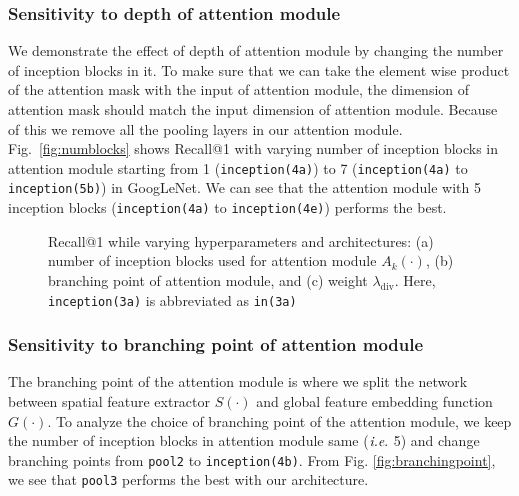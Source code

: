 \documentclass[runningheads]{llncs}
\begin{document}
\subsubsection{Sensitivity to depth of attention module}
We demonstrate the effect of depth of attention module by changing the number of inception blocks in it.
To make sure that we can take the element wise product of the attention mask with the input of attention module, the dimension of attention mask should match the input dimension of attention module.
Because of this we remove all the pooling layers in our attention module.
Fig.~\ref{fig:numblocks} shows Recall@1 with varying number of inception blocks in attention module starting from 1 (\texttt{inception(4a)}) to 7 (\texttt{inception(4a)} to \texttt{inception(5b)}) in GoogLeNet.
We can see that the attention module with 5 inception blocks (\texttt{inception(4a)} to \texttt{inception(4e)}) performs the best.


\begin{figure}[t]
\begin{center}
\end{center}
\vspace{-6mm}
\caption{Recall@1 while varying hyperparameters and architectures: (a) number of inception blocks used for attention module $A_k(\cdot)$, (b) branching point of attention module, and (c) weight $\lambda_\mathrm{div}$. Here, \texttt{inception(3a)} is abbreviated as \texttt{in(3a)}}
\label{fig:ablationfigures}
\end{figure}



\subsubsection{Sensitivity to branching point of attention module}
The branching point of the attention module is where we split the network between spatial feature extractor $S(\cdot)$ and global feature embedding function $G(\cdot)$.
To analyze the choice of branching point of the attention module, we keep the number of inception blocks in attention module same ($\emph{i.e}.$ 5) and change branching points from \texttt{pool2} to \texttt{inception(4b)}. From Fig. \ref{fig:branchingpoint}, we see that \texttt{pool3} performs the best with our architecture.
\end{document}
